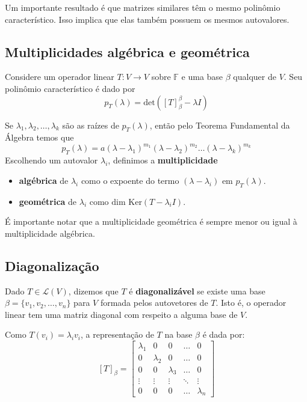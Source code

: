 \documentclass[12pt,a4paper]{article}
\begin{document}
Um importante resultado é que matrizes similares têm o mesmo polinômio característico. Isso implica que elas também possuem os mesmos autovalores.

\subsection{Multiplicidades algébrica e geométrica}

Considere um operador linear $T:V\to V$ sobre $\mathbb{F}$ e uma base $\beta$ qualquer de $V$. Seu polinômio característico é dado por \[ p_T(\lambda) = \text{det}([T]_\beta^{\beta} - \lambda I) \]

Se $\lambda_1, \lambda_2, \ldots, \lambda_k$ são as raízes de $p_T(\lambda)$, então pelo Teorema Fundamental da Álgebra temos que
\[
p_T(\lambda) = a(\lambda - \lambda_1)^{m_1} (\lambda - \lambda_2)^{m_2} \ldots (\lambda - \lambda_k)^{m_k}
\]
Escolhendo um autovalor $\lambda_i$, definimos a \textbf{multiplicidade}

\begin{itemize}
\item \textbf{algébrica} de $\lambda_i$ como o expoente do termo $(\lambda - \lambda_i)$ em $p_T(\lambda)$.
\item \textbf{geométrica} de $\lambda_i$ como $\text{dim Ker}(T - \lambda_i I)$.
\end{itemize}

É importante notar que a multiplicidade geométrica é sempre menor ou igual à multiplicidade algébrica.

\subsection{Diagonalização}

Dado $T \in \mathcal{L}(V)$, dizemos que $T$ é \textbf{diagonalizável} se existe uma base $\beta = \{ v_1, v_2, \ldots, v_n \}$ para $V$ formada pelos autovetores de $T$. Isto é, o operador linear tem uma matriz diagonal com respeito a alguma base de $V$.

Como $T(v_i) = \lambda_i v_i$, a representação de $T$ na base $\beta$ é dada por:
\[
[T]_{\beta} = \begin{bmatrix}
\lambda_1 & 0 & 0 & \ldots & 0 \\
0 & \lambda_2 & 0 & \ldots & 0 \\
0 & 0 & \lambda_3 & \ldots & 0 \\
\vdots & \vdots & \vdots & \ddots & \vdots \\
0 & 0 & 0 & \ldots & \lambda_n
\end{bmatrix}
\]
\end{document}
